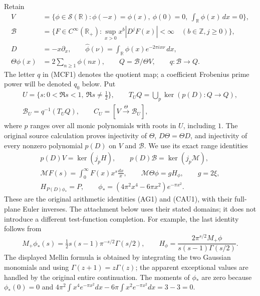 \documentclass[11pt,a4paper]{article}
\begin{document}
Retain
\[
\begin{split}
V&=\{\phi\in\mathcal S(\mathbb R):\phi(-x)=\phi(x),\
                  \phi(0)=0,\ \int_{\mathbb R}\phi(x)\,dx=0\},\\
\mathscr B&=\{F\in C^\infty(\mathbb R_+):
 \sup_{x>0}x^b|D^jF(x)|<\infty\quad(b\in\mathbb Z,j\geq0)\},\\
D&=-x\partial_x,\qquad
\widehat\phi(\nu)=\int_{\mathbb R}\phi(x)e^{-2\pi ix\nu}\,dx,\\
\Theta\phi(x)&=2\sum_{n\geq1}\phi(nx),\qquad
Q=\mathscr B/\Theta V,\qquad q:\mathscr B\longrightarrow Q.
\end{split}
\tag{MCF1}
\]
The letter $q$ in (MCF1) denotes the quotient map; a coefficient Frobenius
prime power will be denoted $q_0$ below.  Put
\[
\begin{gathered}
U=\{s:0<\Re s<1,\ \Re s\ne\tfrac12\},\qquad
T_UQ=\bigcup_p\ker(p(D):Q\to Q),\\
\mathscr B_U=q^{-1}(T_UQ),\qquad
C_U=[V\xrightarrow\Theta\mathscr B_U],
\end{gathered}
\tag{MCF2}
\]
where $p$ ranges over all monic polynomials with roots in $U$, including $1$.
The original source calculation proves injectivity of $\Theta$,
$D\Theta=\Theta D$, and injectivity of every nonzero polynomial $p(D)$
on $V$ and $\mathscr B$.  We use its exact range identities
\[
\begin{gathered}
p(D)V=\ker(j_pH),\qquad
p(D)\mathscr B=\ker(j_p\mathcal M),\\
\mathcal MF(s)=\int_0^\infty F(x)x^s\frac{dx}{x},\qquad
\mathcal M\Theta\phi=gH_\phi,\qquad g=2\xi,\\
H_{P(D)\phi_*}=P,\qquad
\phi_*=(4\pi^2x^4-6\pi x^2)e^{-\pi x^2}.
\end{gathered}
\tag{MCF3}
\]
These are the original arithmetic identities (AG1) and (CAU1), with their
full-plane Euler inverses.  The attachment below uses their stated domains;
it does not introduce a different test-function completion.  For example,
the last identity follows from
\[
M_+\phi_*(s)=\tfrac12s(s-1)\pi^{-s/2}\Gamma(s/2),\qquad
H_\phi=\frac{2\pi^{s/2}M_+\phi}{s(s-1)\Gamma(s/2)}.
\]
The displayed Mellin formula is obtained by integrating the two Gaussian
monomials and using $\Gamma(z+1)=z\Gamma(z)$; the apparent exceptional
values are handled by the original entire continuation.  The moments of
$\phi_*$ are zero because $\phi_*(0)=0$ and
$4\pi^2\int x^4e^{-\pi x^2}dx-6\pi\int x^2e^{-\pi x^2}dx=3-3=0$.
\end{document}
